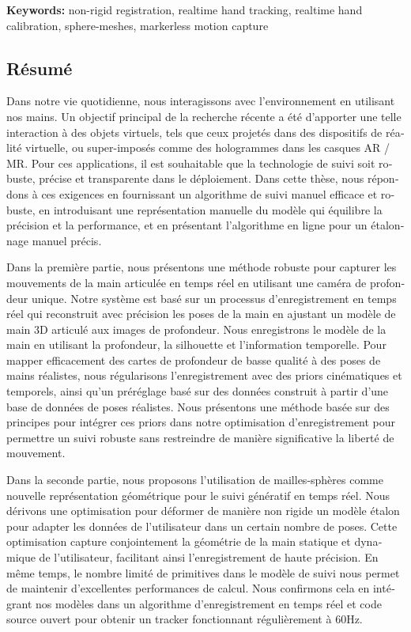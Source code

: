 \textbf{Keywords:} non-rigid registration, realtime hand tracking, realtime hand calibration, sphere-meshes, markerless motion capture

\begin{otherlanguage}{french}
\cleardoublepage
\chapter*{Résumé}

Dans notre vie quotidienne, nous interagissons avec l'environnement en utilisant nos mains. Un objectif principal de la recherche récente a été d'apporter une telle interaction à des objets virtuels, tels que ceux projetés dans des dispositifs de réalité virtuelle, ou super-imposés comme des hologrammes dans les casques AR / MR. Pour ces applications, il est souhaitable que la technologie de suivi soit robuste, précise et transparente dans le déploiement. Dans cette thèse, nous répondons à ces exigences en fournissant un algorithme de suivi manuel efficace et robuste, en introduisant une représentation manuelle du modèle qui équilibre la précision et la performance, et en présentant l'algorithme en ligne pour un étalonnage manuel précis.

Dans la première partie, nous présentons une méthode robuste pour capturer les mouvements de la main articulée en temps réel en utilisant une caméra de profondeur unique. Notre système est basé sur un processus d'enregistrement en temps réel qui reconstruit avec précision les poses de la main en ajustant un modèle de main 3D articulé aux images de profondeur. Nous enregistrons le modèle de la main en utilisant la profondeur, la silhouette et l'information temporelle. Pour mapper efficacement des cartes de profondeur de basse qualité à des poses de mains réalistes, nous régularisons l'enregistrement avec des priors cinématiques et temporels, ainsi qu'un préréglage basé sur des données construit à partir d'une base de données de poses réalistes. Nous présentons une méthode basée sur des principes pour intégrer ces priors dans notre optimisation d'enregistrement pour permettre un suivi robuste sans restreindre de manière significative la liberté de mouvement.

Dans la seconde partie, nous proposons l'utilisation de mailles-sphères comme nouvelle représentation géométrique pour le suivi génératif en temps réel. Nous dérivons une optimisation pour déformer de manière non rigide un modèle étalon pour adapter les données de l'utilisateur dans un certain nombre de poses. Cette optimisation capture conjointement la géométrie de la main statique et dynamique de l'utilisateur, facilitant ainsi l'enregistrement de haute précision. En même temps, le nombre limité de primitives dans le modèle de suivi nous permet de maintenir d'excellentes performances de calcul. Nous confirmons cela en intégrant nos modèles dans un algorithme d'enregistrement en temps réel et code source ouvert pour obtenir un tracker fonctionnant régulièrement à 60Hz.


\end{otherlanguage}
